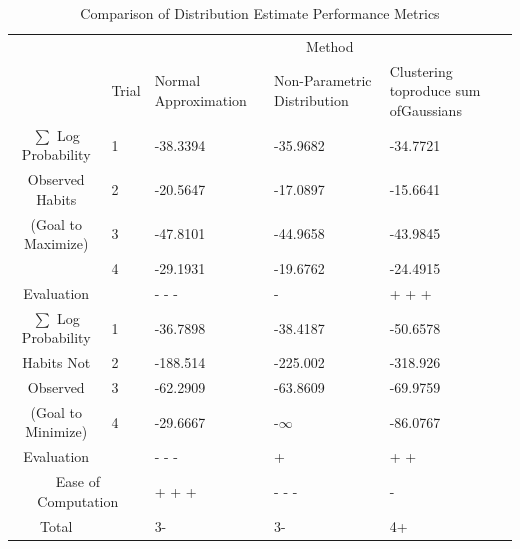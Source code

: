 \documentclass[11pt]{article} %
\begin{document}
\pagebreak
\begin{table}[h!]
\vspace{0.5cm}
\caption{Comparison of Distribution Estimate Performance Metrics}
\begin{tabular}{| p{1.25in} | p{.25in} | p{1.25in} | p{1.25in} | p{1.25in} |}
\cline{3-5}
\multicolumn{2}{c}{}&\multicolumn{3}{|c|}{Method} \\
\cline{2-5}
\multicolumn{1}{c|}{}&\multicolumn{1}{|c|}{Trial}&Normal \newline Approximation&Non-Parametric \newline Distribution&Clustering to\newline produce sum of\newline Gaussians\\
\hline
\multicolumn{1}{|c|}{$\sum$ Log Probability} &1&-38.3394&-35.9682&-34.7721 \\
\cline{2-5}
\multicolumn{1}{|c|}{Observed Habits} &2&-20.5647&-17.0897&-15.6641 \\
\cline{2-5}
\multicolumn{1}{|c|}{(Goal to Maximize)} &3&-47.8101&-44.9658&-43.9845 \\
\cline{2-5}
\multicolumn{1}{|c|}{} &4&-29.1931&-19.6762&-24.4915 \\
\hline
\multicolumn{1}{|c}{Evaluation}&&- - -&-&+ + +\\
\hline
\multicolumn{1}{|c|}{$\sum$ Log Probability} &1&-36.7898&-38.4187&-50.6578\\
\cline{2-5}
\multicolumn{1}{|c|}{Habits Not} &2&-188.514&-225.002&-318.926 \\
\cline{2-5}
\multicolumn{1}{|c|}{Observed} &3&-62.2909&-63.8609&-69.9759 \\
\cline{2-5}
\multicolumn{1}{|c|}{(Goal to Minimize)} &4&-29.6667&-$\infty$&-86.0767 \\
\hline
\multicolumn{1}{|c}{Evaluation}&&- - -&+&+ +\\
\hline
\multicolumn{2}{|c|}{Ease of Computation} &+ + + &- - -&-\\
\hline \hline
\multicolumn{1}{|c}{Total}& &3- &3-&4+\\
\hline
\end{tabular}
\label{tab:pugh2}
\end{table}
\end{document}
